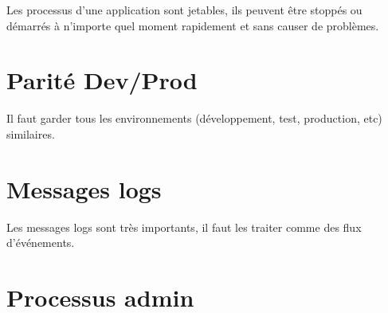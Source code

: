 Les processus d'une application sont jetables, ils peuvent être stoppés ou démarrés à n'importe quel moment rapidement et sans causer de problèmes.

\section*{Parité Dev/Prod}

Il faut garder tous les environnements (développement, test, production, etc) similaires.

\section*{Messages logs}

Les messages logs sont très importants, il faut les traiter comme des flux d'événements.

\section*{Processus admin}